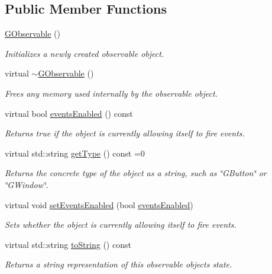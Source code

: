 \subsection*{Public Member Functions}
\begin{DoxyCompactItemize}
\item 
\mbox{\hyperlink{classGObservable_aa083d318cdd2a045471445fbbd26b919}{G\+Observable}} ()
\begin{DoxyCompactList}\small\item\em Initializes a newly created observable object. \end{DoxyCompactList}\item 
virtual \mbox{\hyperlink{classGObservable_a755e7879db8b0a71916cfde365d49305}{$\sim$\+G\+Observable}} ()
\begin{DoxyCompactList}\small\item\em Frees any memory used internally by the observable object. \end{DoxyCompactList}\item 
virtual bool \mbox{\hyperlink{classGObservable_a8ebb3da91032e7f4c34485dabc518b8a}{events\+Enabled}} () const
\begin{DoxyCompactList}\small\item\em Returns true if the object is currently allowing itself to fire events. \end{DoxyCompactList}\item 
virtual std\+::string \mbox{\hyperlink{classGObservable_a799e073a127b428cc841086d42ea4fed}{get\+Type}} () const =0
\begin{DoxyCompactList}\small\item\em Returns the concrete type of the object as a string, such as {\ttfamily \char`\"{}\+G\+Button\char`\"{}} or {\ttfamily \char`\"{}\+G\+Window\char`\"{}}. \end{DoxyCompactList}\item 
virtual void \mbox{\hyperlink{classGObservable_afaa30b2a9e0f378fd1c70d2f1d0b8216}{set\+Events\+Enabled}} (bool \mbox{\hyperlink{classGObservable_a8ebb3da91032e7f4c34485dabc518b8a}{events\+Enabled}})
\begin{DoxyCompactList}\small\item\em Sets whether the object is currently allowing itself to fire events. \end{DoxyCompactList}\item 
virtual std\+::string \mbox{\hyperlink{classGObservable_a1fe5121d6528fdea3f243321b3fa3a49}{to\+String}} () const
\begin{DoxyCompactList}\small\item\em Returns a string representation of this observable object\textquotesingle{}s state. \end{DoxyCompactList}\end{DoxyCompactItemize}
